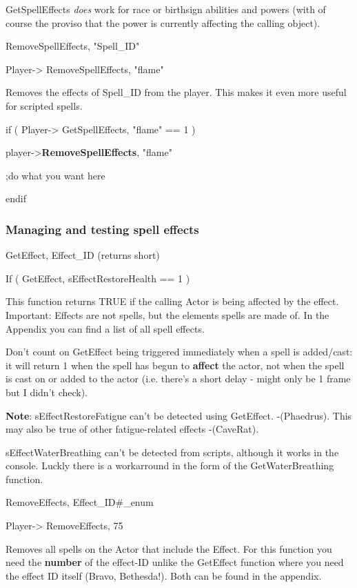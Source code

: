 GetSpellEffects \emph{does} work for race or birthsign abilities and
powers (with of course the proviso that the power is currently affecting
the calling object).

RemoveSpellEffects, "Spell\_ID"

Player-> RemoveSpellEffects, "flame"

Removes the effects of Spell\_ID from the player. This makes it even
more useful for scripted spells.

if ( Player-> GetSpellEffects, "flame" == 1 )

player->\textbf{RemoveSpellEffects}, "flame"

;do what you want here

endif

\hypertarget{managing-and-testing-spell-effects}{%
\subsubsection{Managing and testing spell
effects}\label{managing-and-testing-spell-effects}}

GetEffect, Effect\_ID (returns short)

If ( GetEffect, sEffectRestoreHealth == 1 )

This function returns TRUE if the calling Actor is being affected by the
effect. Important: Effects are not spells, but the elements spells are
made of. In the Appendix you can find a list of all spell effects.

Don't count on GetEffect being triggered immediately when a spell is
added/cast: it will return 1 when the spell has begun to \textbf{affect}
the actor, not when the spell is cast on or added to the actor (i.e.
there's a short delay - might only be 1 frame but I didn't check).

\textbf{Note}: sEffectRestoreFatigue can't be detected using GetEffect.
-(Phaedrus). This may also be true of other fatigue-related effects
-(CaveRat).

sEffectWaterBreathing can't be detected from scripts, although it works
in the console. Luckly there is a workarround in the form of the
GetWaterBreathing function.

RemoveEffects, Effect\_ID\#\_enum

Player-> RemoveEffects, 75

Removes all spells on the Actor that include the Effect. For this
function you need the \textbf{number} of the effect-ID unlike the
GetEffect function where you need the effect ID itself (Bravo,
Bethesda!). Both can be found in the appendix.

